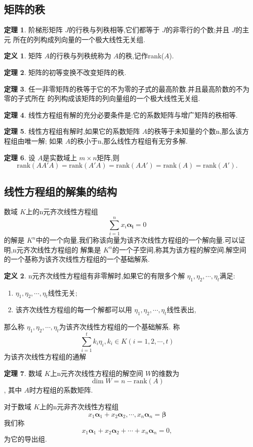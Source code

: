 \documentclass[a4paper,11pt]{article}%
\theoremstyle{remark}
\theoremstyle{definition}
\newtheorem{theorem}{定理}[section]
\theoremstyle{definition}
\newtheorem*{definition}{定义}
\theoremstyle{plain}
\begin{document}
\subsection{矩阵的秩}
\begin{theorem}
    阶梯形矩阵 $J$的行秩与列秩相等,它们都等于 $J$的非零行的个数;并且 $J$的主元
    所在的列构成列向量的一个极大线性无关组.
\end{theorem}
\begin{definition}
    矩阵 $A$的行秩与列秩统称为 $A$的秩,记作rank($A$).
\end{definition}
\begin{theorem}
    矩阵的初等变换不改变矩阵的秩.
\end{theorem}
\begin{theorem}
    任一非零矩阵的秩等于它的不为零的子式的最高阶数.并且最高阶数的不为零的子式所在
    的列构成该矩阵的列向量组的一个极大线性无关组.
\end{theorem}
\begin{theorem}
    线性方程组有解的充分必要条件是:它的系数矩阵与增广矩阵的秩相等.
\end{theorem}
\begin{theorem}
    线性方程组有解时,如果它的系数矩阵 $A$的秩等于未知量的个数n,那么该方程组由唯一解;
    如果 $A$的秩小于n,那么线性方程组有无穷多解.
\end{theorem}
\begin{theorem}
     设 $A$是实数域上 $m\times n$矩阵,则
     \[\text{rank}(AA'A)=\text{rank}(A'A)=\text{rank}(AA')=\text{rank}(A)=\text{rank}(A').\]
\end{theorem}
\subsection{线性方程组的解集的结构}
数域 $K$上的n元齐次线性方程组
\[\sum_{i=1}^{n}{x_i \bm{\alpha_i}}=0\]
的解是 $K^n$中的一个向量,我们称该向量为该齐次线性方程组的一个解向量.可以证明,n元齐次线性方程组的
解集是 $K^n$的一个子空间,称其为该方程的解空间.解空间的一个基称为该齐次线性方程组的一个基础解系.
\begin{definition}
    n元齐次线性方程组有非零解时,如果它的有限多个解 $\eta _1,\eta _2,\cdots,\eta _t$满足:
    \begin{enumerate}
        \item $\eta_1,\eta_2,\cdots,\eta_t$线性无关;
        \item 该齐次线性方程组的每一个解都可以用 $\eta_1,\eta_2,\cdots,\eta_t$线性表出,
    \end{enumerate}
    那么称 $\eta_1,\eta_2,\cdots,\eta_t$为该齐次线性方程组的一个基础解系.
    称
    \[\sum_{i=1}^{t}k_i\eta_i,k_i\in K(i=1,2,\cdots,t)\]
    为该齐次线性方程组的通解
\end{definition}
\begin{theorem}
    数域 $K$上n元齐次线性方程组的解空间 $W$的维数为
    \[\dim W=n-\text{rank}(A)\],
    其中 $A$时方程组的系数矩阵.
\end{theorem}
对于数域 $K$上的n元非齐次线性方程组
\[x_1\bm{\alpha}_1+x_2\bm{\alpha}_2,\cdots,x_n\bm{\alpha}_n=\bm{\beta}\]
我们称
\[x_1\bm{\alpha}_1+x_2\bm{\alpha}_2+\cdots+x_n\bm{\alpha}_n=0,\]
为它的导出组.
\end{document}
